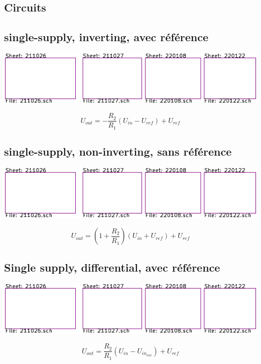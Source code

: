 \documentclass[resume]{subfiles}
\begin{document}
\begin{multicols}{3}
\section{Circuits}
\subsection{single-supply, inverting, avec référence}
\begin{center}
\includegraphics[scale=1,page=15]{../KiCad/resume-crop.pdf}
\end{center}
$$\boxed{U_{out}=-\frac{R_2}{R_1}\left(U_{in}-U_{ref}\right)+U_{ref}}$$
\subsection{single-supply, non-inverting, sans référence}
\begin{center}
\includegraphics[scale=1,page=16]{../KiCad/resume-crop.pdf}
\end{center}
$$\boxed{U_{out}=\left(1+\frac{R_2}{R_1}\right)\left(U_{in}+U_{ref}\right)+U_{ref}}$$
\columnbreak
\subsection{Single supply, differential, avec référence}
\label{sec_ss_diff_ref}
\begin{center}
\includegraphics[scale=1,page=5]{../KiCad/resume-crop.pdf}
\end{center}
$$\boxed{U_{out}=\frac{R_2}{R_1}\left(U_{in}-U_{in_{inv}}\right)+U_{ref}}$$

\end{multicols}
\end{document}
